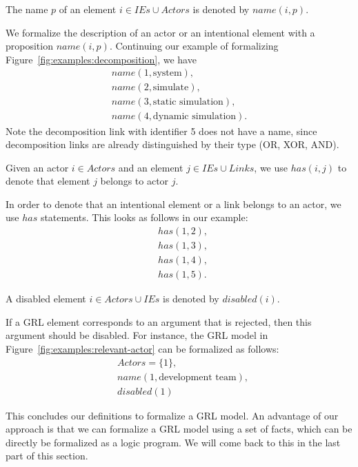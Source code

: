 \begin{definition}
The name $p$ of an element $i\in IEs\cup Actors$ is denoted by $name(i,p)$.
\end{definition}

\rationale{} We formalize the description of an actor or an intentional element with a proposition $name(i,p)$. Continuing our example of formalizing Figure~\ref{fig:examples:decomposition}, we have 
\begin{align*}
&name(1,\text{system}),&\\
&name(2,\text{simulate}),&\\
&name(3,\text{static\ simulation}),&\\
&name(4, \text{dynamic simulation}).&
\end{align*}
Note the decomposition link with identifier 5 does not have a name, since decomposition links are already distinguished by their type (OR, XOR, AND).

\begin{definition}
Given an actor $i\in Actors$ and an element $j\in IEs\cup Links$, we use $has(i,j)$ to denote that element $j$ belongs to actor $j$.
\end{definition}

\rationale{} In order to denote that an intentional element or a link belongs to an actor, we use $has$ statements. This looks as follows in our example:
\begin{align*}
&has(1, 2),\\
&has(1, 3),\\
&has(1, 4),\\
&has(1, 5).
\end{align*}

\begin{definition}
A disabled element $i\in Actors\cup IEs$ is denoted by $disabled(i)$.
\end{definition}

\rationale{} If a GRL element corresponds to an argument that is rejected, then this argument should be disabled. For instance, the GRL model in Figure~\ref{fig:examples:relevant-actor} can be formalized as follows:
\begin{align*}
&Actors = \{1\},\\
&name(1, \text{development team}),\\
&disabled(1)
\end{align*}

This concludes our definitions to formalize a GRL model. An advantage of our approach is that we can formalize a GRL model using a set of facts, which can be directly be formalized as a logic program. We will come back to this in the last part of this section.

